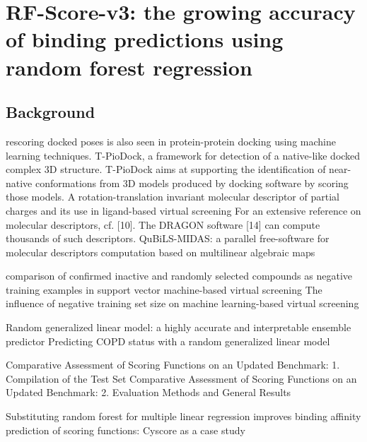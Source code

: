 \chapter{RF-Score-v3: the growing accuracy of binding predictions using random forest regression}

\section{Background}

\citep{1399} rescoring docked poses is also seen in protein-protein docking using machine learning techniques. T-PioDock, a framework for detection of a native-like docked complex 3D structure. T-PioDock aims at supporting the identification of near-native conformations from 3D models produced by docking software by scoring those models.
\citep{1389} A rotation-translation invariant molecular descriptor of partial charges and its use in ligand-based virtual screening
\citep{1389} For an extensive reference on molecular descriptors, cf. [10]. The DRAGON software [14] can compute thousands of such descriptors.
\citep{1400} QuBiLS-MIDAS: a parallel free-software for molecular descriptors computation based on multilinear algebraic maps

\citep{1423} comparison of confirmed inactive and randomly selected compounds as negative training examples in support vector machine-based virtual screening
\citep{1404} The influence of negative training set size on machine learning-based virtual screening

\citep{1377} Random generalized linear model: a highly accurate and interpretable ensemble predictor
\citep{1418} Predicting COPD status with a random generalized linear model

\citep{1426} Comparative Assessment of Scoring Functions on an Updated Benchmark: 1. Compilation of the Test Set
\citep{1411} Comparative Assessment of Scoring Functions on an Updated Benchmark: 2. Evaluation Methods and General Results

\citep{1432} Substituting random forest for multiple linear regression improves binding affinity prediction of scoring functions: Cyscore as a case study

\chapterend
